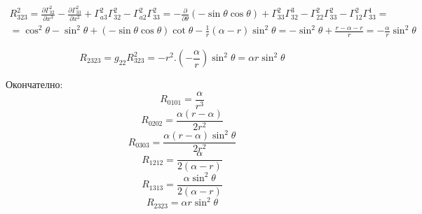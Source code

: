 \documentclass[a4paper,12pt]{article}
\begin{document}
    \begin{equation*}
        \begin{aligned}
            R^2_{323} = \frac{\partial\varGamma^2_{32}}{\partial x^3} - \frac{\partial\varGamma^2_{33}}{\partial x^2} + \varGamma^2_{a3}\varGamma^2_{32} - \varGamma^2_{a2}\varGamma^2_{33} = -\frac{\partial}{\partial\theta}(-\sin\theta\cos\theta) + \varGamma^2_{33}\varGamma^3_{32}-\varGamma^2_{22}\varGamma^2_{33}-\varGamma^2_{12}\varGamma^1_{33}= \\
            = \cos^2\theta-\sin^2\theta + (-\sin\theta\cos\theta)\cot\theta - \frac{1}{r}(\alpha-r)\sin^2\theta = -\sin^2\theta + \frac{r-\alpha-r}{r}=-\frac{\alpha}{r}\sin^2\theta
        \end{aligned}
    \end{equation*}

    \begin{equation*}
        R_{2323}=g_{22}R^2_{323}=-r^2.\left( -\frac{\alpha}{r} \right)\sin^2\theta=\alpha r\sin^2\theta
    \end{equation*}

    Окончателно: 
    \begin{equation*}
        R_{0101} = \frac{\alpha}{r^3} 
    \end{equation*}
    \begin{equation*}
        R_{0202} = \frac{\alpha(r-\alpha)}{2r^2} 
    \end{equation*}
    \begin{equation*}
        R_{0303} = \frac{\alpha(r-\alpha)\sin^2\theta}{2r^2} 
    \end{equation*}
    \begin{equation*}
        R_{1212} = \frac{\alpha}{2(\alpha-r)} 
    \end{equation*}
    \begin{equation*}
        R_{1313} = \frac{\alpha\sin^2\theta}{2(\alpha-r)} 
    \end{equation*}
    \begin{equation*}
        R_{2323} = \alpha r\sin^2\theta
    \end{equation*}
\end{document}
